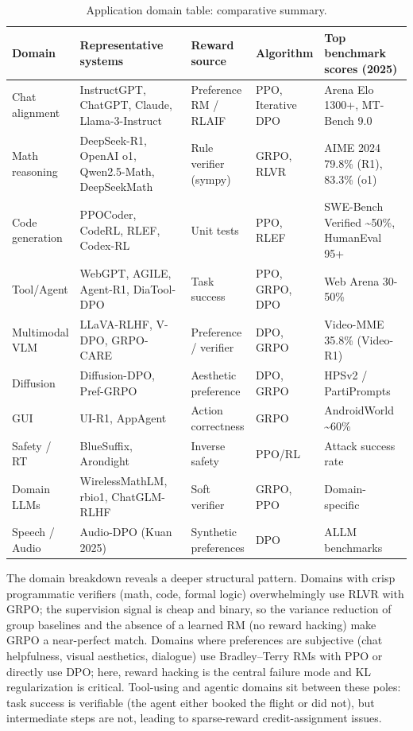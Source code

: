 \documentclass{article}
\begin{document}
\begin{table}[t]
\centering
\caption{Application domain table: comparative summary.}
\label{tab:application-domain-table}
\begin{tabular}{>{\raggedright\arraybackslash}p{0.1056\linewidth}
  >{\raggedright\arraybackslash}p{0.3521\linewidth}
  >{\raggedright\arraybackslash}p{0.1479\linewidth}
  >{\raggedright\arraybackslash}p{0.1268\linewidth}
  >{\raggedright\arraybackslash}p{0.2676\linewidth}}
\toprule
Domain & Representative systems & Reward source & Algorithm & Top benchmark scores (2025) \\
\midrule
Chat alignment & InstructGPT, ChatGPT, Claude, Llama-3-Instruct & Preference RM / RLAIF & PPO, Iterative DPO & Arena Elo 1300+, MT-Bench 9.0 \\
Math reasoning & DeepSeek-R1, OpenAI o1, Qwen2.5-Math, DeepSeekMath & Rule verifier (sympy) & GRPO, RLVR & AIME 2024 79.8\% (R1), 83.3\% (o1) \\
Code generation & PPOCoder, CodeRL, RLEF, Codex-RL & Unit tests & PPO, RLEF & SWE-Bench Verified \textasciitilde50\%, HumanEval 95+ \\
Tool/Agent & WebGPT, AGILE, Agent-R1, DiaTool-DPO & Task success & PPO, GRPO, DPO & Web Arena 30-50\% \\
Multimodal VLM & LLaVA-RLHF, V-DPO, GRPO-CARE & Preference / verifier & DPO, GRPO & Video-MME 35.8\% (Video-R1) \\
Diffusion & Diffusion-DPO, Pref-GRPO & Aesthetic preference & DPO, GRPO & HPSv2 / PartiPrompts \\
GUI & UI-R1, AppAgent & Action correctness & GRPO & AndroidWorld \textasciitilde60\% \\
Safety / RT & BlueSuffix, Arondight & Inverse safety & PPO/RL & Attack success rate \\
Domain LLMs & WirelessMathLM, rbio1, ChatGLM-RLHF & Soft verifier & GRPO, PPO & Domain-specific \\
Speech / Audio & Audio-DPO (Kuan 2025) & Synthetic preferences & DPO & ALLM benchmarks \\
\end{tabular}
\end{table}

The domain breakdown reveals a deeper structural pattern. Domains with crisp programmatic verifiers (math, code, formal logic) overwhelmingly use RLVR with GRPO; the supervision signal is cheap and binary, so the variance reduction of group baselines and the absence of a learned RM (no reward hacking) make GRPO a near-perfect match. Domains where preferences are subjective (chat helpfulness, visual aesthetics, dialogue) use Bradley--Terry RMs with PPO or directly use DPO; here, reward hacking is the central failure mode and KL regularization is critical. Tool-using and agentic domains sit between these poles: task success is verifiable (the agent either booked the flight or did not), but intermediate steps are not, leading to sparse-reward credit-assignment issues.
\end{document}
